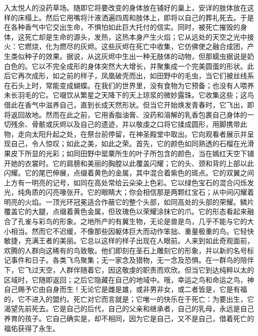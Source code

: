入太悦人的没药草场。随即它将要改变的身体放在铺好的巢上，安详的肢体放在这样的床榻上。然后它用嘴将汁液洒遍四周和肢体上，即将以自己的葬礼死去。于是在各种香气中它交出生命，不惧怕如此巨大托付的信实。同时，被死亡摧毁的身体，这死亡却是生命的源头，发热，这热本身产生火焰；它从远处的天空之光中接火：它燃烧，化为燃尽的灰烬。这些灰烬在死亡中收集，它仿佛使之融合成团，产生类似种子的效果。据说，从这灰烬中生出一种无肢体的动物，但那蠕虫据说是奶白色的。它以不完全成形的身体突然大大增长，并聚集成一个完美圆蛋的形状。此后它再次成形，如之前的样子，凤凰破壳而出，如田野中的毛虫，当它们被丝线系在石头上时，常能变成蝴蝶。在我们的世界里，没有食物为它预备；也没有人喂养未长羽毛的它。它啜饮从繁星之天降下的天上琼浆的微妙露珠。它收集这些；这鸟借此在香气中滋养自己，直到长成天然形状。但当它开始焕发青春时，它飞出，即将返回故地。然而在此之前，它用香脂油膏、没药和溶解的乳香包裹自己身体的一切残余、骨骸或灰烬以及自己的遗迹，并以敬虔之口将它揉成圆形，用脚携带此物，走向太阳升起之处，在祭台前停留，在神圣殿堂中取出。它向观看者展示并呈现自己，令人惊叹；如此之美，如此之荣。首先，它的颜色如同熟透的石榴在光滑果皮下所显的光彩；如同田野中罂粟所生的叶子所包含的颜色，当在嫣红天空下铺开她的衣裳时。它的肩膀和美丽的胸膛以此覆盖闪耀；它的头、颈和背的上部以此闪耀。它的尾巴伸展，点缀着黄色的金属，其中混合着紫色的斑点。它的双翼之间上方有一明亮的记号，如同在高处常给云朵染上色彩。它以绿色宝石的混合闪烁发光，纯角质的闪亮喙张开。它的眼睛大；你会相信那是两颗红宝石；从中间闪耀着明亮的火焰。一顶光环冠冕适合作蔽它的整个头部，如同高处的头部的荣耀。鳞片覆盖它的大腿，点缀着黄色金属，但玫瑰色以荣耀涂抹它的爪。它的形态看起来融合了孔雀与彩鸟的形象。之地所产的有翼生物，无论是兽是鸟，几乎不能与它的大小相当。然而它不迟缓，不像那些因躯体巨大而动作笨拙、重量极重的鸟。它轻快敏捷，充满王者的美丽。它总以这样的样子出现在人眼前。人来到如此奇观面前，欢腾的人群向这稀有的鸟致敬。他们即刻在圣石上雕刻它的形象，并以新的名号标记事件和日子。各类飞鸟聚集；无一家念及猎物，无一念及恐惧。在一群鸟的陪伴下，它飞过天空，人群伴随着它，因这敬虔的职责而欢欣。但当它到达纯粹以太的区域时，它随即返回；之后它隐藏在自己的地域中。哦，幸运之鸟和命运之鸟，神自己赐予它由自身而生！无论它是雌是雄，或非男非女，或二者皆是，它是有福的，它不进入的盟约。死亡对它而言就是；它唯一的快乐在于死亡：为要出生，它渴望先前死去。它是自己的后代，自己的父亲和继承者，自己的乳母，永远是自己养育的孩子。它自己确实是，却不相同，因为它是自己，又不是自己，借着死亡的福佑获得了永生。\par

